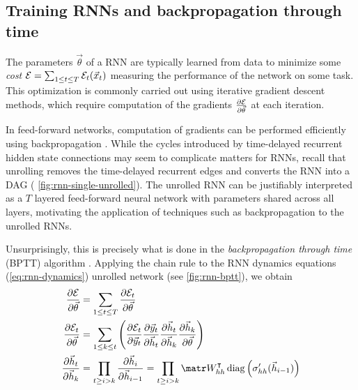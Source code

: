 
\subsection{Training RNNs and backpropagation through time}


The parameters $\vec{\theta}$ of a RNN are typically learned from data to
minimize some \emph{cost} $\mathcal{E} = \sum_{1 \leq t \leq T} \mathcal{E}_t(\vec{x}_t)$
measuring the performance of the network on some task. This optimization is
commonly carried out using iterative gradient descent methods, which require
computation of the gradients $\frac{\partial \mathcal{E}}{\partial \vec{\theta}}$ at each
iteration.

In feed-forward networks, computation of gradients can be performed efficiently
using backpropagation
\citep{bryson1963optimal,linnainmaa1970representation,rumelhart1988learning}.
While the cycles introduced by time-delayed recurrent hidden state connections
may seem to complicate matters for RNNs, recall that unrolling removes the
time-delayed recurrent edges and converts the RNN into a DAG (\eg
\vref{fig:rnn-single-unrolled}). The unrolled RNN can be justifiably
interpreted as a $T$ layered feed-forward neural network with parameters shared
across all layers, motivating the application of techniques such as
backpropagation to the unrolled RNNs.

Unsurprisingly, this is precisely what is done in the \emph{backpropagation
through time} (BPTT) algorithm \citep{goller1996learning}. Applying the
chain rule to the RNN dynamics equations (\vref{eq:rnn-dynamics})
unrolled network (see \cref{fig:rnn-bptt}), we obtain
\begin{align}
  \frac{\pd \mathcal{E}}{\pd \vec{\theta}} &= \sum_{1 \leq t \leq T} \frac{\pd \mathcal{E}_t}{\pd \vec{\theta}} \label{eq:err-total}\\
    \frac{\pd \mathcal{E}_t}{\pd \vec{\theta}} &= \sum_{1 \leq k \leq t} \left(
        \frac{\pd \mathcal{E}_t}{\pd \y_t}
        \frac{\pd \y_t}{\pd \h_t}
        \frac{\pd \h_t}{\pd \h_k}
        \frac{\pd \h_k}{\pd \vec{\theta}}
    \right) \label{eq:error-t}\\
    \frac{\pd \h_t}{\pd \h_k} &=
    \prod_{t \geq i > k} \frac{\pd \h_i}{\pd \h_{i-1}}
    = \prod_{t \geq i > k} \W_{hh}^\tp \diag \left( \sigma_{hh}'( \h_{i-1} ) \right)
    \label{eq:error-transfer}
\end{align}

